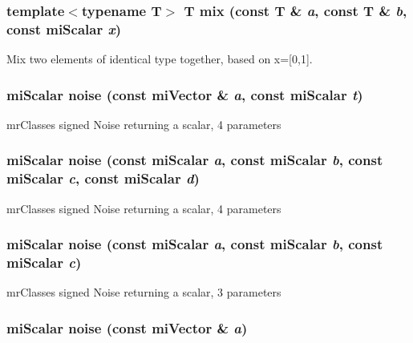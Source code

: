 \subsubsection{\setlength{\rightskip}{0pt plus 5cm}template$<$typename T$>$ T mix (const T \& {\em a}, const T \& {\em b}, const mi\-Scalar {\em x})\hspace{0.3cm}{\tt  [inline]}}\label{namespacersl_a20}


Mix two elements of identical type together, based on x=[0,1]. 

\subsubsection{\setlength{\rightskip}{0pt plus 5cm}mi\-Scalar noise (const mi\-Vector \& {\em a}, const mi\-Scalar {\em t})\hspace{0.3cm}{\tt  [inline]}}\label{namespacersl_a76}


mr\-Classes signed Noise returning a scalar, 4 parameters 

\subsubsection{\setlength{\rightskip}{0pt plus 5cm}mi\-Scalar noise (const mi\-Scalar {\em a}, const mi\-Scalar {\em b}, const mi\-Scalar {\em c}, const mi\-Scalar {\em d})\hspace{0.3cm}{\tt  [inline]}}\label{namespacersl_a75}


mr\-Classes signed Noise returning a scalar, 4 parameters 

\subsubsection{\setlength{\rightskip}{0pt plus 5cm}mi\-Scalar noise (const mi\-Scalar {\em a}, const mi\-Scalar {\em b}, const mi\-Scalar {\em c})\hspace{0.3cm}{\tt  [inline]}}\label{namespacersl_a74}


mr\-Classes signed Noise returning a scalar, 3 parameters 

\subsubsection{\setlength{\rightskip}{0pt plus 5cm}mi\-Scalar noise (const mi\-Vector \& {\em a})\hspace{0.3cm}{\tt  [inline]}}\label{namespacersl_a73}



